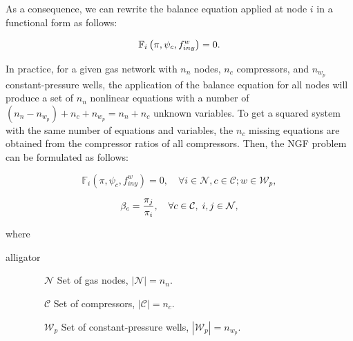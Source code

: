 
As a consequence, we can rewrite the balance equation applied at node $i$ in a functional form as follows:

\begin{equation}
	\label{eq:balance_eq_funtional}
	\mathbb{F}_i\left(\pi,\psi_c,f_{iny}^{w}\right) = 0.
	\vspace{0.3cm}
\end{equation}

In practice, for a given gas network with $n_n$ nodes, $n_c$ compressors, and $n_{w_p}$ constant-pressure wells, the application of the balance equation for all nodes will produce a set of $n_n$ nonlinear equations with a number of $(n_n-n_{w_p})+n_c+n_{w_p} = n_n+n_c$ unknown variables. To get a squared system with the same number of equations and variables, the $n_c$ missing equations are obtained from the compressor ratios of all compressors. Then, the NGF problem can be formulated as follows:

\begin{equation}
	\label{eq:F_i=0}
	\mathbb{F}_i\left(\pi,\psi_c,f_{iny}^{w}\right) = 0, \quad \forall i\in\mathcal{N}, c\in\mathcal{C}; w\in\mathcal{W}_p, 	
\end{equation}

\begin{equation}
	\label{eq:R_c=0}
	\beta_c = \frac{\pi_j}{\pi_i}, \quad \forall c\in\mathcal{C}, \;  i,j\in\mathcal{N},
	\vspace{0.3cm}
\end{equation}

where

\begin{labeling}{alligator}
	\item [$\qquad \qquad  \mathcal{N}$]  \hspace{0.85cm} Set of gas nodes, $|\mathcal{N}|=n_n$.
	\item [$\qquad \qquad  \mathcal{C}$]  \hspace{1cm} Set of compressors, $|\mathcal{C}|=n_c$. 
	\item [$\qquad \qquad  \mathcal{W}_p$] \hspace{0.65cm} Set of constant-pressure wells, $|\mathcal{W}_p|=n_{w_p}$.	
\end{labeling}



